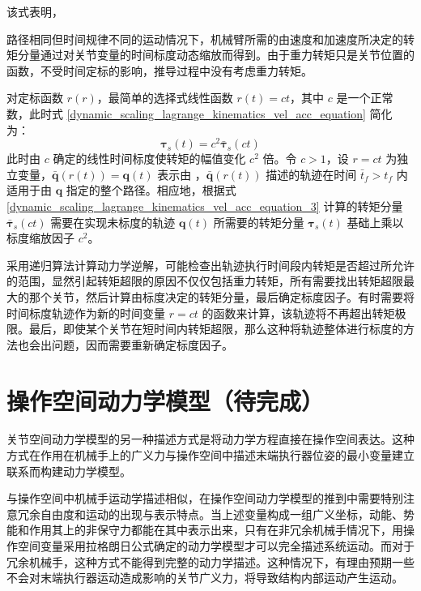 \documentclass[cn,11pt,chinese,blue,bibstyle=ieeetr]{elegantbook}
\begin{document}
该式表明，{路径相同但时间规律不同的运动情况下，机械臂所需的由速度和加速度所决定的转矩分量通过对关节变量的时间标度动态缩放而得到。由于重力转矩只是关节位置的函数，不受时间定标的影响，推导过程中没有考虑重力转矩。

对定标函数 $r\left(r\right)$，最简单的选择式线性函数 $r\left(t\right) = ct$，其中 $c$ 是一个正常数，此时式 \ref{dynamic_scaling_lagrange_kinematics_vel_acc_equation} 简化为：
$$\bm{\tau}_s\left(t\right) = c^2\bm{\bar{\tau}}_s\left(ct\right)$$
此时由 $c$ 确定的线性时间标度使转矩的幅值变化 $c^2$ 倍。令 $c>1$，设 $r = ct$ 为独立变量，$\bm{\bar{q}}\left(r\left(t\right)\right) = \bm{q}\left(t\right)$ 表示由 ，$\bm{\bar{q}}\left(r\left(t\right)\right)$ 描述的轨迹在时间 $\bar{t}_f>t_f$ 内适用于由 $\bm{q}$ 指定的整个路径。相应地，根据式 \ref{dynamic_scaling_lagrange_kinematics_vel_acc_equation_3} 计算的转矩分量 $\bm{\bar{\tau}}_s\left(ct\right)$ 需要在实现未标度的轨迹 $\bm{q}\left(t\right)$ 所需要的转矩分量 $\bm{\tau}_s\left(t\right)$ 基础上乘以标度缩放因子 $c^2$。

采用递归算法计算动力学逆解，可能检查出轨迹执行时间段内转矩是否超过所允许的范围，显然引起转矩超限的原因不仅仅包括重力转矩，所有需要找出转矩超限最大的那个关节，然后计算由标度决定的转矩分量，最后确定标度因子。有时需要将时间标度轨迹作为新的时间变量 $r = ct$ 的函数来计算，该轨迹将不再超出转矩极限。最后，即使某个关节在短时间内转矩超限，那么这种将轨迹整体进行标度的方法也会出问题，因而需要重新确定标度因子。


\section{操作空间动力学模型（待完成）}

关节空间动力学模型的另一种描述方式是将动力学方程直接在操作空间表达。这种方式在作用在机械手上的广义力与操作空间中描述末端执行器位姿的最小变量建立联系而构建动力学模型。

与操作空间中机械手运动学描述相似，在操作空间动力学模型的推到中需要特别注意冗余自由度和运动的出现与表示特点。当上述变量构成一组广义坐标，动能、势能和作用其上的非保守力都能在其中表示出来，只有在非冗余机械手情况下，用操作空间变量采用拉格朗日公式确定的动力学模型才可以完全描述系统运动。而对于冗余机械手，这种方式不能得到完整的动力学描述。这种情况下，有理由预期一些不会对末端执行器运动造成影响的关节广义力，将导致结构内部运动产生运动。

}
\end{document}
